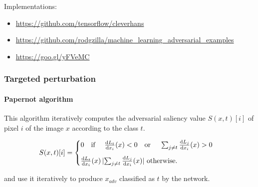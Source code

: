 \documentclass[9pt]{beamer}
\begin{document}
\begin{frame}
  \medskip

  Implementations:
  \begin{itemize}
    \item \url{https://github.com/tensorflow/cleverhans}
    \item \url{https://github.com/rodgzilla/machine\_learning\_adversarial\_examples}
    \item \url{https://goo.gl/yFVeMC}
  \end{itemize}

\end{frame}

\appendix

\begin{frame}
  \frametitle{Targeted perturbation}

  \framesubtitle{Papernot algorithm}

  This algorithm iteratively computes the adversarial saliency value
  $S(x, t)[i]$ of pixel $i$ of the image $x$ according to the class
  $t$.

  \medskip

  \[
  S(x, t)[i] =
  \begin{cases}
    0 \text{\quad if \quad} \frac{\mathrm{d} L_{t}}{\mathrm{d} x_{i}}(x) < 0
    \text{\quad or \quad} \sum_{j \neq t} \frac{\mathrm{d} L_{j}}{\mathrm{d} x_{i}}(x)
    > 0 \\[0.3cm]
    \frac{\mathrm{d} L_{t}}{\mathrm{d} x_{i}}(x) \, \lvert \sum_{j \neq
      t} \frac{\mathrm{d} L_{j}}{\mathrm{d} x_{i}}(x) \rvert \text{ otherwise.}
  \end{cases}
  \]

  \medskip

  and use it iteratively to produce $x_{adv}$ classified as $t$ by the
  network.

\end{frame}
\end{document}
